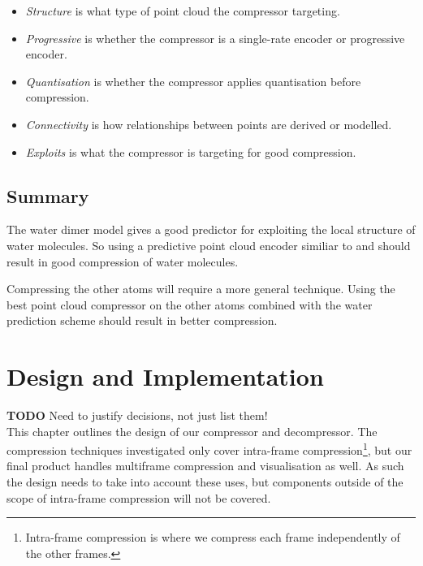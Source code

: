 \documentclass{report}
\newcommand{\todo}{\textbf{TODO} }
\begin{document}
\begin{itemize}
\item \emph{Structure} is what type of point cloud the compressor targeting.

\item \emph{Progressive} is whether the compressor is a single-rate encoder or
  progressive encoder.

\item \emph{Quantisation} is whether the compressor applies quantisation
  before compression.

\item \emph{Connectivity} is how relationships between points are derived or
  modelled.

\item \emph{Exploits} is what the compressor is targeting for good
  compression.
\end{itemize}


\section{Summary}

The water dimer model gives a good predictor for exploiting the local
structure of water molecules. So using a predictive point cloud encoder
similiar to \citep{merrycomp} and \citep{gumholdcomp} should result in good
compression of water molecules.

Compressing the other atoms will require a more general technique. Using the
best point cloud compressor on the other atoms combined with the water
prediction scheme should result in better compression.


\chapter{Design and Implementation}

\todo Need to justify decisions, not just list them! \\

This chapter outlines the design of our compressor and decompressor. The
compression techniques investigated only cover intra-frame
compression\footnote{Intra-frame compression is where we compress each frame
  independently of the other frames.}, but our final product handles
multiframe compression and visualisation as well. As such the design needs to
take into account these uses, but components outside of the scope of
intra-frame compression will not be covered.
\end{document}
